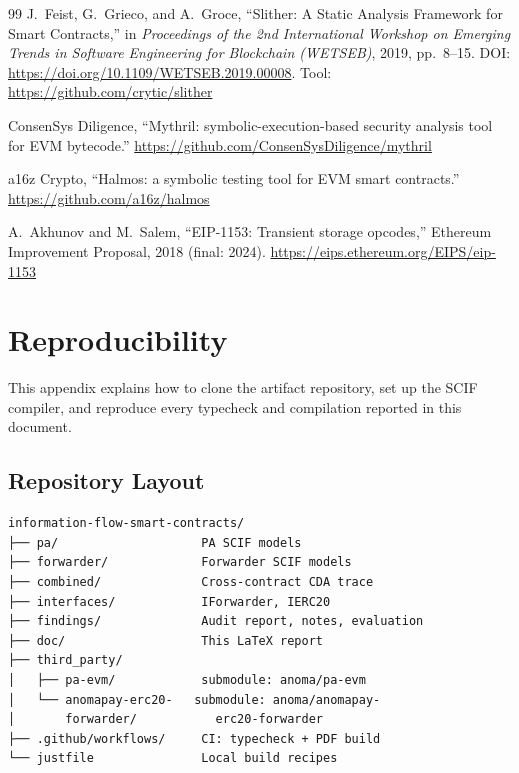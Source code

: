 \documentclass[11pt,a4paper]{article}
\begin{document}
\begin{thebibliography}{99}
  J.~Feist, G.~Grieco, and A.~Groce,
  ``Slither: A Static Analysis Framework for Smart Contracts,''
  in \emph{Proceedings of the 2nd International Workshop on Emerging Trends
  in Software Engineering for Blockchain (WETSEB)}, 2019, pp.~8--15.
  DOI: \url{https://doi.org/10.1109/WETSEB.2019.00008}.
  Tool: \url{https://github.com/crytic/slither}

  ConsenSys Diligence,
  ``Mythril: symbolic-execution-based security analysis tool for EVM
  bytecode.''
  \url{https://github.com/ConsenSysDiligence/mythril}

  a16z Crypto,
  ``Halmos: a symbolic testing tool for EVM smart contracts.''
  \url{https://github.com/a16z/halmos}

  A.~Akhunov and M.~Salem,
  ``EIP-1153: Transient storage opcodes,''
  Ethereum Improvement Proposal, 2018 (final: 2024).
  \url{https://eips.ethereum.org/EIPS/eip-1153}

\end{thebibliography}

\appendix

\section{Reproducibility}
\label{app:reproducibility}

This appendix explains how to clone the artifact repository, set up the
SCIF compiler, and reproduce every typecheck and compilation reported in
this document.

\subsection{Repository Layout}

\begin{small}
\begin{verbatim}
information-flow-smart-contracts/
├── pa/                    PA SCIF models
├── forwarder/             Forwarder SCIF models
├── combined/              Cross-contract CDA trace
├── interfaces/            IForwarder, IERC20
├── findings/              Audit report, notes, evaluation
├── doc/                   This LaTeX report
├── third_party/
│   ├── pa-evm/            submodule: anoma/pa-evm
│   └── anomapay-erc20-   submodule: anoma/anomapay-
│       forwarder/           erc20-forwarder
├── .github/workflows/     CI: typecheck + PDF build
└── justfile               Local build recipes
\end{verbatim}
\end{small}
\end{document}
